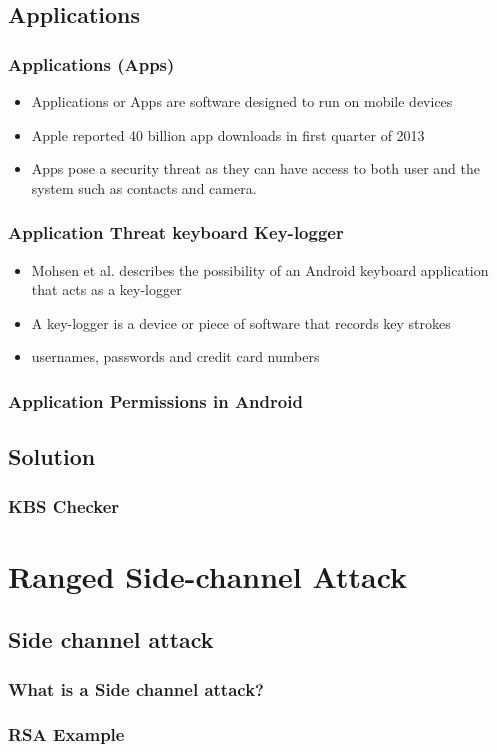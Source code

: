 \documentclass{beamer}
\begin{document}
	\subsection{Applications}
		\begin{frame}
		\frametitle{Applications (Apps)}
		\begin{itemize}
		\item Applications or Apps are software designed to run on mobile devices 
		\item Apple reported 40 billion app downloads in first quarter of 2013 
		\item Apps pose a security threat as they can have access to both user and the system such as contacts and camera.
		\end{itemize}
		\end{frame}
		\begin{frame}
		\frametitle{Application Threat keyboard Key-logger}
		\begin{itemize}
		\item Mohsen et al. describes the possibility of an Android keyboard application that acts as a key-logger
		\item A key-logger is a device or piece of software that records key strokes
		\item usernames, passwords and credit card numbers  
		\end{itemize}
		\end{frame}
		\begin{frame}
		\frametitle{Application Permissions in Android}
		\end{frame}
		
	\subsection{Solution}
		\begin{frame}
		\frametitle{KBS Checker}
		\end{frame}
		
		
		
\section{Ranged Side-channel Attack}
	\subsection{Side channel attack}
		\begin{frame}
		\frametitle{What is a Side channel attack?}
		\end{frame}
		\begin{frame}
		\frametitle{RSA Example}
		\end{frame}
\end{document}
